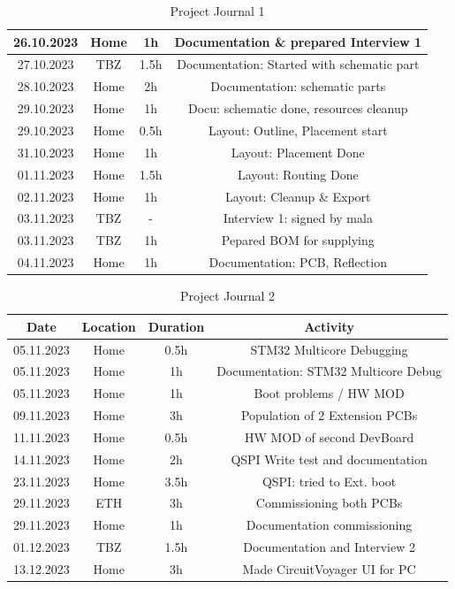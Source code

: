 \begin{table}[H]
\begin{tabular}{||c | c | c || c||}
 \hline
   26.10.2023 & Home & 1h & Documentation \& prepared Interview 1 \\ 
 \hline
  27.10.2023 & TBZ & 1.5h & Documentation: Started with schematic part \\ 
 \hline
  28.10.2023 & Home & 2h & Documentation: schematic parts \\ 
 \hline
  29.10.2023 & Home & 1h & Docu: schematic done, resources cleanup \\ 
 \hline
   29.10.2023 & Home & 0.5h & Layout: Outline, Placement start \\ 
 \hline
   31.10.2023 & Home & 1h & Layout: Placement Done \\ 
 \hline   
   01.11.2023 & Home & 1.5h & Layout: Routing Done \\ 
 \hline
  02.11.2023 & Home & 1h & Layout: Cleanup \& Export \\ 
 \hline
  03.11.2023 & TBZ & - & Interview 1: signed by mala \\ 
 \hline  
  03.11.2023 & TBZ & 1h & Pepared BOM for supplying \\ 
 \hline
  04.11.2023 & Home & 1h & Documentation: PCB, Reflection \\ 
 \hline

\end{tabular}
    \caption{Project Journal 1}\label{tab:Project Journal 1}
\end{table}

\newpage

\begin{table}[H]
  \centering
  
  \begin{tabular}{||c | c | c || c||} 
    \hline
    Date &  Location & Duration & Activity \\ [0.5ex] 
    \hline\hline
    05.11.2023 & Home & 0.5h & STM32 Multicore Debugging \\ 
    \hline
     05.11.2023 & Home & 1h & Documentation: STM32 Multicore Debug \\ 
    \hline
     05.11.2023 & Home & 1h & Boot problems / HW MOD \\ 
    \hline
    09.11.2023 & Home & 3h & Population of 2 Extension PCBs \\ 
    \hline
    11.11.2023 & Home & 0.5h & HW MOD of second DevBoard \\ 
    \hline
    14.11.2023 & Home & 2h & QSPI Write test and documentation \\ 
    \hline
    23.11.2023 & Home & 3.5h & QSPI: tried to Ext. boot \\ 
    \hline
    29.11.2023 & ETH & 3h & Commissioning both PCBs \\ 
    \hline
    29.11.2023 & Home & 1h & Documentation commissioning \\ 
    \hline
    01.12.2023 & TBZ & 1.5h & Documentation and Interview 2 \\ 
    \hline
    13.12.2023 & Home & 3h & Made CircuitVoyager UI for PC \\ 
    \hline
  \end{tabular}
  \caption{Project Journal 2}\label{tab:Project Journal 2}
\end{table}

